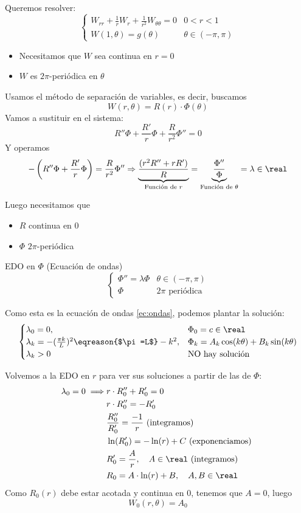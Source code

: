 		Queremos resolver:
		\[
			\begin{cases}
			W_{rr} + \frac{1}{r} W_r + \frac{1}{r^2} W_{\theta \theta} = 0 & 0 < r < 1 \\
			W(1, \theta) = g(\theta) & \theta \in (-\pi,\pi)
			\end{cases}
		\]

		\begin{itemize}
			\item Necesitamos que $W$ sea continua en $r=0$
			\item $W$ es $2\pi$-periódica en $\theta$
		\end{itemize}

		Usamos el método de separación de variables, es decir, buscamos $$W(r, \theta) = R(r)\cdot \Phi(\theta)$$
		Vamos a sustituir en el sistema:
		\[R''\Phi + \frac{R'}{r}\Phi + \frac{R}{r^2} \Phi'' = 0 \]
		Y operamos
		\[ - \left( R'' \Phi + \frac{R'}{r}\Phi \right) = \frac{R}{r^2} \Phi'' \Rightarrow \underbrace{\frac{(r^2R''+rR')}{R}}_{\text{Función de }r} = \underbrace{\frac{\Phi''}{\Phi}}_{\text{Función de }\theta} = \lambda \in \real \]

		Luego necesitamos que
		\begin{itemize}
			\item $R$ continua en 0
			\item $\Phi$ $2\pi$-periódica
		\end{itemize}


		EDO en $\Phi$ (Ecuación de ondas)
		\[
			\begin{cases}
				\Phi'' = \lambda \Phi & \theta \in (-\pi, \pi) \\
				\Phi & 2\pi \text{ periódica }
			\end{cases}
		\]

		Como esta es la ecuación de ondas \ref{ec:ondas}, podemos plantar la solución:
		\[
			\begin{cases}
				\lambda_0 = 0,& \Phi_0 = c \in \real\\
				\lambda_k = -(\frac{\pi k}{L})^2 \eqreason{$\pi=L$} -k^2, & \Phi_k = A_k \cos (k\theta) + B_k \sin (k\theta)\\
				\lambda_k > 0 & \text{NO hay solución}
			\end{cases}
		\]

		Volvemos a la EDO en $r$ para ver sus soluciones a partir de las de $\Phi$:
		\begin{align*}
			\lambda_0 = 0 \implies & r\cdot R_0'' + R'_0 = 0\\
			& r\cdot R_0'' = - R'_0\\
			& \frac{R''_0}{R'_0} = \frac{-1}{r} \text{ (integramos) }\\
			& \ln(R'_0) = - \ln(r) + C \text{ (exponenciamos) }\\
			& R'_0 = \frac{A}{r}, \quad A \in \real \text{ (integramos) }\\
			& R_0 = A \cdot \ln(r) + B, \quad A,B \in \real
		\end{align*}
		Como $R_0(r)$ debe estar acotada y continua en 0, tenemos que $A = 0$, luego $$W_{0}(r, \theta) = A_0$$

